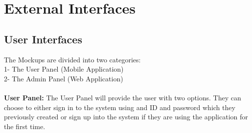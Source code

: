 \newpage
\section{External Interfaces}

\subsection{User Interfaces}
The Mockups are divided into two categories:\\
1- The User Panel (Mobile Application) \\
2- The Admin Panel (Web Application)\\
\\
\textbf{User Panel:}
The User Panel will provide the user with two options. They can choose to either sign in to the system using and ID and password which they previously created or sign up into the system if they are using the application for the first time. 



